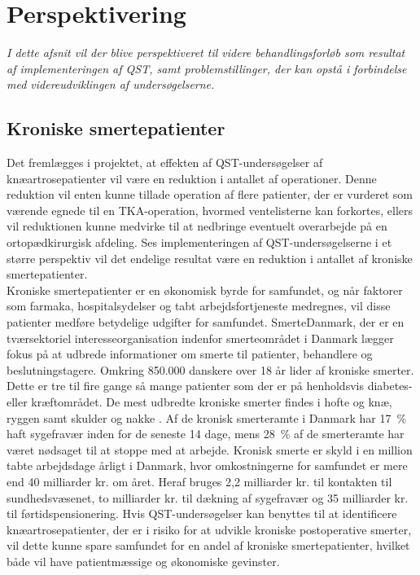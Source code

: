 \newpage\section{Perspektivering}\label{perspektivering}
\textit{I dette afsnit vil der blive perspektiveret til videre behandlingsforløb som resultat af implementeringen af QST, samt problemstillinger, der kan opstå i forbindelse med videreudviklingen af undersøgelserne.}

\subsection{Kroniske smertepatienter}
Det fremlægges i projektet, at effekten af QST-undersøgelser af knæartrosepatienter  vil være en reduktion i antallet af operationer. Denne reduktion vil enten kunne tillade operation af flere patienter, der er vurderet som værende egnede til  en TKA-operation, hvormed ventelisterne kan forkortes, ellers vil reduktionen kunne medvirke til at nedbringe eventuelt overarbejde på en ortopædkirurgisk afdeling. Ses implementeringen af QST-undersøgelserne i et større perspektiv vil det endelige resultat være en reduktion i antallet af kroniske smertepatienter. \\
Kroniske smertepatienter er en økonomisk byrde for samfundet, og når faktorer som farmaka, hospitalsydelser og tabt arbejdsfortjeneste medregnes, vil disse patienter medføre betydelige udgifter for samfundet. SmerteDanmark, der er en tværsektoriel interesseorganisation indenfor smerteområdet i Danmark lægger fokus på at udbrede informationer om smerte til patienter, behandlere og beslutningstagere. Omkring 850.000 danskere over 18 år lider af kroniske smerter. Dette er tre til fire gange så mange patienter som der er på henholdsvis diabetes- eller kræftområdet. \citep{SmerteDanmark} De mest udbredte kroniske smerter findes i hofte og knæ, ryggen samt skulder og nakke \citep{SmerteDanmark1}. Af de kronisk smerteramte i Danmark har 17~\% haft sygefravær inden for de seneste 14 dage, mens 28~\% af de smerteramte har været nødsaget til at stoppe med at arbejde. Kronisk smerte er skyld i en million tabte arbejdsdage årligt i Danmark, hvor omkostningerne for samfundet er mere end 40 milliarder kr. om året. Heraf bruges 2,2 milliarder kr. til kontakten til sundhedsvæsenet, to milliarder kr. til dækning af sygefravær og 35 milliarder kr. til førtidspensionering. Hvis QST-undersøgelser kan benyttes til at identificere knæartrosepatienter, der er i risiko for at udvikle kroniske postoperative smerter, vil dette kunne spare samfundet for en andel af kroniske smertepatienter, hvilket både vil have patientmæssige og økonomiske gevinster. \citep{SmerteDanmark}

